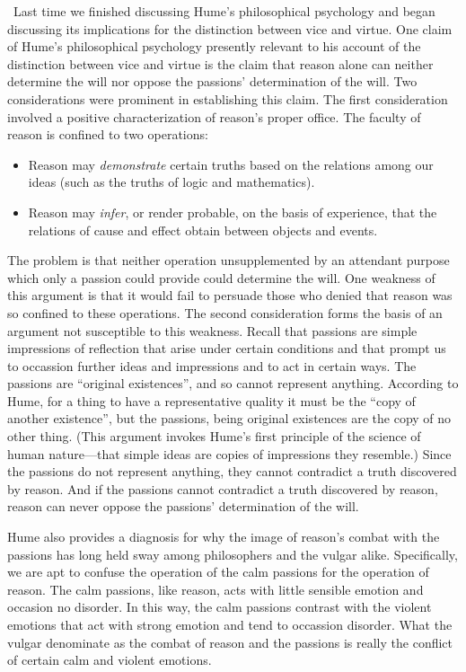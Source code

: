 \change\ Last time we finished discussing Hume's philosophical psychology and began discussing its implications for the distinction between vice and virtue. One claim of Hume's philosophical psychology presently relevant to his account of the distinction between vice and virtue is the claim that reason alone can neither determine the will nor oppose the passions' determination of the will. Two considerations were prominent in establishing this claim. The first consideration involved a positive characterization of reason's proper office. The faculty of reason is confined to two operations:
\begin{itemize}
	\item Reason may \emph{demonstrate} certain truths based on the relations among our ideas (such as the truths of logic and mathematics).
	\item Reason may \emph{infer}, or render probable, on the basis of experience, that the relations of cause and effect obtain between objects and events.
\end{itemize}
The problem is that neither operation unsupplemented by an attendant purpose which only a passion could provide could determine the will. One weakness of this argument is that it would fail to persuade those who denied that reason was so confined to these operations. The second consideration forms the basis of an argument not susceptible to this weakness. Recall that passions are simple impressions of reflection that arise under certain conditions and that prompt us to occassion further ideas and impressions and to act in certain ways. The passions are ``original existences'', and so cannot represent anything. According to Hume, for a thing to have a representative quality it must be the ``copy of another existence'', but the passions, being original existences are the copy of no other thing. (This argument invokes Hume's first principle of the science of human nature---that simple ideas are copies of impressions they resemble.) Since the passions do not represent anything, they cannot contradict a truth discovered by reason. And if the passions cannot contradict a truth discovered by reason, reason can never oppose the passions' determination of the will.

Hume also provides a diagnosis for why the image of reason's combat with the passions has long held sway among philosophers and the vulgar alike. Specifically, we are apt to confuse the operation of the calm passions for the operation of reason. The calm passions, like reason, acts with little sensible emotion and occasion no disorder. In this way, the calm passions contrast with the violent emotions that act with strong emotion and tend to occassion disorder. What the vulgar denominate as the combat of reason and the passions is really the conflict of certain calm and violent emotions.

